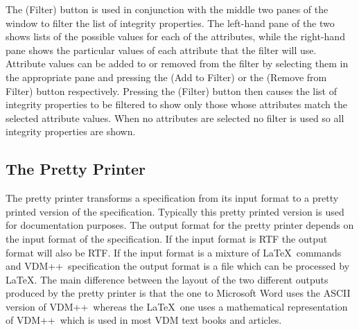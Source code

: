 \documentclass[\pformat,12pt]{article}
\newcommand{\vdmslpp}{VDM++}
\newcommand{\guicmd}[1]{{\sf #1}}
\begin{document}
The
(\guicmd{Filter}) button is used in conjunction with the middle two
panes of the window to filter the list of integrity properties. The
left-hand pane of the two shows lists of the possible values for each
of 
the attributes, while the right-hand pane shows the particular values
of each attribute that the filter will use. Attribute values can be
added to or removed from the filter by selecting them in the
appropriate pane and pressing the 
(\guicmd{Add to Filter}) or the 
(\guicmd{Remove from Filter}) button respectively. Pressing the 
(\guicmd{Filter}) button then causes the list of integrity properties
to be filtered to show only those whose attributes match the selected
attribute values. When no attributes are selected no filter is used so
all integrity properties are shown.


\newpage
\subsection{The Pretty Printer}\label{sec:pp}

The pretty printer transforms a specification from its input format to
a pretty printed version of the specification. Typically this pretty
printed version is used for documentation purposes. The output format
for the pretty printer depends on the input format of the
specification. If the input format is RTF the output format will also
be RTF. If the input format is a mixture of \LaTeX\ commands and
\vdmslpp\ specification the output format is a file which can be processed
by \LaTeX. 
The main difference between the layout of the
two different outputs produced by the pretty printer is that the one
to Microsoft Word uses the ASCII version of \vdmslpp\ whereas the
\LaTeX\ one uses a mathematical representation of \vdmslpp\ which
is used in most VDM text books and articles.
\end{document}
